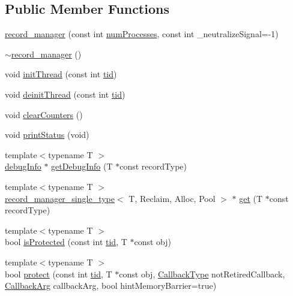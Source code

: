 \subsection*{Public Member Functions}
\begin{DoxyCompactItemize}
\item 
\hyperlink{classrecord__manager_a6c504d455df4b4eb7569f633baac409d}{record\+\_\+manager} (const int \hyperlink{testing_8cpp_aa085812188e21ede75351d88b9b2c30d}{num\+Processes}, const int \+\_\+neutralize\+Signal=-\/1)
\item 
\hyperlink{classrecord__manager_a40ef9dfae2ecd2f874b4598b5791fb96}{$\sim$record\+\_\+manager} ()
\item 
void \hyperlink{classrecord__manager_ab577f40a0f82ddff6b42dcd77e53e4ab}{init\+Thread} (const int \hyperlink{microbench_2main_8cpp_a9ca9869868fe7e7a38a921cc7de4103f}{tid})
\item 
void \hyperlink{classrecord__manager_a3e2437bdf46d90f3feb3a140e9a0d223}{deinit\+Thread} (const int \hyperlink{microbench_2main_8cpp_a9ca9869868fe7e7a38a921cc7de4103f}{tid})
\item 
void \hyperlink{classrecord__manager_a74dca7b17e0e0d9980a3c4bc7f413905}{clear\+Counters} ()
\item 
void \hyperlink{classrecord__manager_abb929ae26dc7d00c936c2c8878ccf8c3}{print\+Status} (void)
\item 
{\footnotesize template$<$typename T $>$ }\\\hyperlink{classdebugInfo}{debug\+Info} $\ast$ \hyperlink{classrecord__manager_a642b6e4ad8a8267d0258489bc7d21a5b}{get\+Debug\+Info} (T $\ast$const record\+Type)
\item 
{\footnotesize template$<$typename T $>$ }\\\hyperlink{classrecord__manager__single__type}{record\+\_\+manager\+\_\+single\+\_\+type}$<$ T, Reclaim, Alloc, Pool $>$ $\ast$ \hyperlink{classrecord__manager_a3d009645b6ae65ced7f8b9cff3f3cf09}{get} (T $\ast$const record\+Type)
\item 
{\footnotesize template$<$typename T $>$ }\\bool \hyperlink{classrecord__manager_a411492c56b7263d775f078c6a9924122}{is\+Protected} (const int \hyperlink{microbench_2main_8cpp_a9ca9869868fe7e7a38a921cc7de4103f}{tid}, T $\ast$const obj)
\item 
{\footnotesize template$<$typename T $>$ }\\bool \hyperlink{classrecord__manager_a365022ebe1998ef801830406a6847fcc}{protect} (const int \hyperlink{microbench_2main_8cpp_a9ca9869868fe7e7a38a921cc7de4103f}{tid}, T $\ast$const obj, \hyperlink{globals_8h_a57f5c0d40b156d7d996492fb2f16e3cd}{Callback\+Type} not\+Retired\+Callback, \hyperlink{globals_8h_a3de64ef48066ac6430631c8b81a15345}{Callback\+Arg} callback\+Arg, bool hint\+Memory\+Barrier=true)

\end{DoxyCompactItemize}

